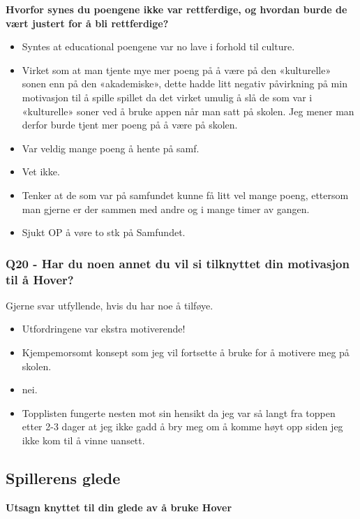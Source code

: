 \textbf{Hvorfor synes du poengene ikke var rettferdige, og hvordan burde de vært justert for å bli rettferdige?}
\begin{itemize}[noitemsep]
	\item Syntes at educational poengene var no lave i forhold til culture.
	\item Virket som at man tjente mye mer poeng på å være på den «kulturelle» sonen enn på den «akademiske», dette hadde litt negativ påvirkning på min motivasjon til å spille spillet da det virket umulig å slå de som var i «kulturelle» soner ved å bruke appen når man satt på skolen. Jeg mener man derfor burde tjent mer poeng på å være på skolen.
	\item Var veldig mange poeng å hente på samf.
	\item Vet ikke.
	\item Tenker at de som var på samfundet kunne få litt vel mange poeng, ettersom man gjerne er der sammen med andre og i mange timer av gangen.
	\item Sjukt OP å vøre to stk på Samfundet.
\end{itemize}


\subsubsection*{Q20 - Har du noen annet du vil si tilknyttet din motivasjon til å Hover?}
Gjerne svar utfyllende, hvis du har noe å tilføye.
\begin{itemize}[noitemsep]
	\item Utfordringene var ekstra motiverende!
	\item Kjempemorsomt konsept som jeg vil fortsette å bruke for å motivere meg på skolen.
	\item nei.
	\item Topplisten fungerte nesten mot sin hensikt da jeg var så langt fra toppen etter 2-3 dager at jeg ikke gadd å bry meg om å komme høyt opp siden jeg ikke kom til å vinne uansett.
\end{itemize}







\newpage
\subsection*{Spillerens glede}

\textbf{Utsagn knyttet til din glede av å bruke Hover}

